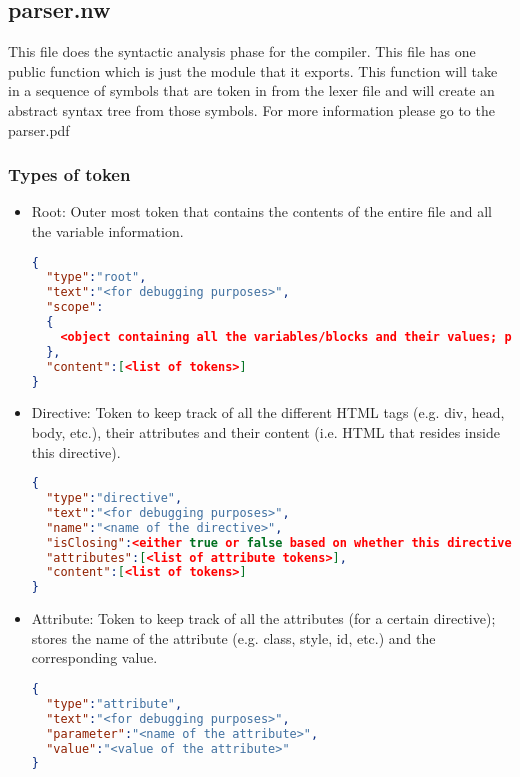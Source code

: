 \documentclass{article}
\begin{document}
\subsection{parser.nw}

  This file does the syntactic analysis phase for the compiler. This file has one public function which is just the module that it exports. This function will take in a sequence of symbols that are token in from the lexer file and will create an abstract syntax tree from those symbols. For more information please go to the parser.pdf
  
\subsubsection{Types of token}

\begin{itemize}
      \item Root: Outer most token that contains the contents of the entire file and all the variable information.
\begin{lstlisting}[language=json,firstnumber=1]
{
  "type":"root",
  "text":"<for debugging purposes>",
  "scope":
  {
    <object containing all the variables/blocks and their values; passed in by the client>
  },
  "content":[<list of tokens>]
}
\end{lstlisting}

  \item Directive: Token to keep track of all the different HTML tags (e.g. div, head, body, etc.), their attributes and their content (i.e. HTML that resides inside this directive).
\begin{lstlisting}[language=json,firstnumber=1]
{
  "type":"directive",
  "text":"<for debugging purposes>",
  "name":"<name of the directive>",
  "isClosing":<either true or false based on whether this directive should have a closing tag>,
  "attributes":[<list of attribute tokens>],
  "content":[<list of tokens>]
}
\end{lstlisting}

  \item Attribute: Token to keep track of all the attributes (for a certain directive); stores the name of the attribute (e.g. class, style, id, etc.) and the corresponding value.
\begin{lstlisting}[language=json,firstnumber=1]
{
  "type":"attribute",
  "text":"<for debugging purposes>",
  "parameter":"<name of the attribute>",
  "value":"<value of the attribute>"
}
\end{lstlisting}


\end{itemize}
\end{document}
